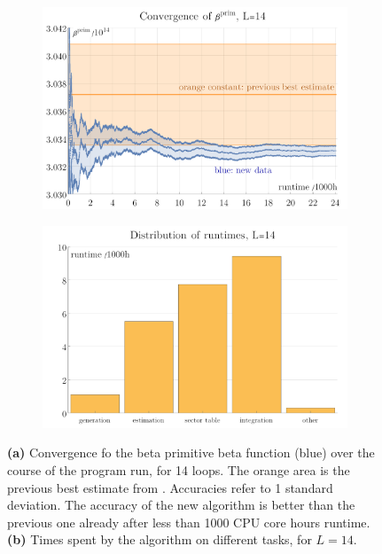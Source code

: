 \documentclass[11pt]{scrartcl}
\numberwithin{equation}{section}
\begin{document}
\begin{figure}[htb]
	
	\begin{subfigure}{ .49 \linewidth}
		\centering
		\includegraphics[width=\linewidth]{figures/beta14_convergence}
		\subcaption{}
		\label{fig:beta14_convergence}
	\end{subfigure}
	\begin{subfigure}{ .49 \linewidth}
		\centering
		\includegraphics[width=\linewidth]{figures/beta14_runtimes}
		\subcaption{}
		\label{fig:beta14_runtimes}
	\end{subfigure}
	\caption{ 
		\textbf{(a)}  Convergence fo the beta primitive beta function (blue) over the course of the program run, for 14 loops. The orange area is the previous best estimate from \cite{balduf_statistics_2023}. Accuracies refer to 1 standard deviation.  The accuracy of the new algorithm is better than the previous one already after less than 1000 CPU core hours runtime. 
		\textbf{(b)} Times spent by the algorithm on different tasks, for $L=14$.  }
	
\end{figure}
\end{document}
